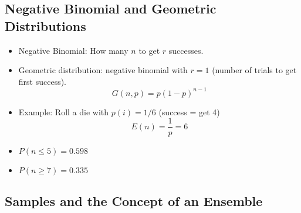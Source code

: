 \subsection{Negative Binomial and Geometric Distributions}

\begin{itemize}
      \item Negative Binomial: How many $n$ to get $r$ successes.
      \item Geometric distribution: negative binomial with $r=1$ (number of trials to get first success).
            \[ G(n,p) = p (1-p)^{n-1} \]
      \item Example: Roll a die with $p(i) = 1/6$ (success = get 4)
            \[ E(n) = \frac{1}{p} = 6 \]
      \item $P(n \le 5) = 0.598$
      \item $P(n \ge 7) = 0.335$
\end{itemize}

\subsection{Samples and the Concept of an Ensemble}

